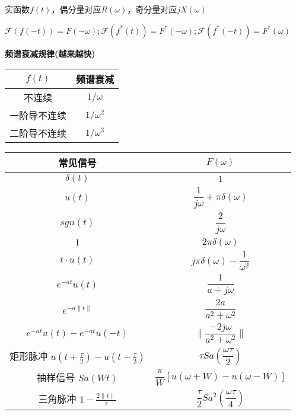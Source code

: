实函数$f(t)$，偶分量对应$R(\omega)$，奇分量对应$jX(\omega)$

$\mathcal{F}(f(-t))=F(-\omega);\mathcal{F}(f^*(t))=F^*(-\omega);\mathcal{F}(f^*(-t))=F^*(\omega) $

\textbf{频谱衰减规律(越来越快)}

\begin{tabular}{c|c}
$f(t)$ & 频谱衰减 \\
\hline
不连续 & $1/\omega$ \\
一阶导不连续 & $1/\omega^2$ \\
二阶导不连续 & $1/\omega^3$ \\
\end{tabular}

\begin{tabular}{c|c}
常见信号 & $F(\omega)$ \\
\hline
$\delta(t)$ & $1$ \\
$u(t)$ & $\dfrac{1}{j\omega}+\pi\delta(\omega)$ \\
$sgn(t)$ & $\dfrac{2}{j\omega}$ \\
$1$ & $2\pi\delta(\omega)$ \\
$t\cdot u(t)$ & $j\pi\delta(\omega)-\dfrac{1}{\omega^2}$ \\
$e^{-at} u(t)$ & $\dfrac{1}{a+j\omega}$ \\
$e^{-a\|t\|}$ & $\dfrac{2a}{a^2 + \omega^2}$ \\
$e^{-at}u(t)-e^{-at}u(-t)$ & $\|\dfrac{-2j\omega}{a^2 + \omega^2}\|$ \\
矩形脉冲 $u(t+\frac{\tau}{2})-u(t-\frac{\tau}{2})$ & $\tau Sa(\dfrac{\omega\tau}{2})$ \\
抽样信号 $Sa(Wt)$ & $\dfrac{\pi}{W}[u(\omega+W)-u(\omega-W)]$ \\
三角脉冲 $1-\frac{2\|t\|}{\tau}$ & $\dfrac{\tau}{2} Sa^2(\dfrac{\omega\tau}{4})$ \\
\end{tabular}

